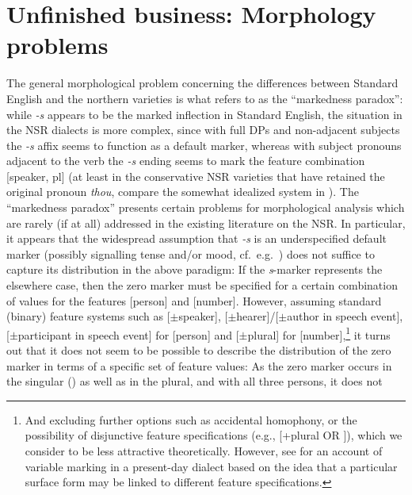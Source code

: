 \documentclass[output=paper]{langsci/langscibook}
\begin{document}
\section{Unfinished business: Morphology problems}
\label{sec:post-synt-appr}

The general morphological problem concerning the differences between Standard
English and the northern varieties is what \citet{Pietsch:2005b} refers to as
the ``markedness paradox'': while \emph{-s} appears to be the marked inflection
in Standard English, the situation in the \gls{NSR}
dialects is more complex,
since with full DPs and non-adjacent subjects the \emph{-s} affix seems to
function as a default marker, whereas with subject pronouns adjacent to the verb
the \emph{-s} ending seems to mark the feature combination [\textminus speaker, \textminus pl] (at
least in the conservative \gls{NSR} varieties that have retained the original
\Ssg{} pronoun \emph{thou}, compare the somewhat idealized system in ). The ``markedness paradox'' presents certain problems for morphological
analysis which are rarely (if at all) addressed in the existing literature on
the \gls{NSR}. In particular, it appears that the widespread assumption that
\emph{-s} is an underspecified default marker (possibly signalling tense and/or
mood, cf.\ e.g.\
\citealt{Henry:1995,Pietsch:2005b,deHaas:2011,deHaasandvanKemenade:2015}) does not suffice to capture its distribution in the above
paradigm: If the \emph{s}-marker represents the elsewhere\is{elsewhere condition} case, then the
zero marker must be specified for a certain combination of values for the
features [person] and [number]. However, assuming standard (binary) feature
systems such as [$\pm$speaker], [$\pm$hearer]/[$\pm$author in speech event],
[$\pm$participant in speech event] for [person] and [$\pm$plural] for
[number],\footnote{And excluding further options such as accidental homophony,
    or the possibility of disjunctive feature specifications  (e.g., [+plural OR
    \Fsg]), which we consider to be less attractive theoretically. However, see
    \textcite{AdgerSmith2010} for an account of variable \isi{agreement} marking in a
    present-day dialect based on the idea that a particular surface form may be
linked to different feature specifications.} it turns out that it does not seem
to be possible to describe the distribution of the zero marker in terms of a
specific set of feature values: As the zero marker occurs in the singular
(\Fsg{}) as well as in the plural, and with all three persons, it does not
\end{document}
